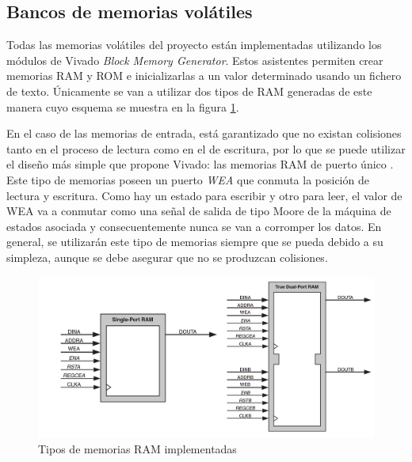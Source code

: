 \subsection{Bancos de memorias volátiles\label{memo}}
Todas las memorias volátiles del proyecto están implementadas utilizando los módulos de Vivado \emph{Block Memory Generator}. Estos asistentes permiten crear memorias RAM y ROM e inicializarlas a un valor determinado usando un fichero de texto. Únicamente se van a utilizar dos tipos de RAM generadas de este manera cuyo esquema se muestra  en la figura \ref{fig:rams}.

En el caso de las memorias de entrada, está garantizado que no existan colisiones tanto en el proceso de lectura como en el de escritura, por lo que se puede utilizar el diseño más simple que propone Vivado: las memorias RAM de puerto único \cite{ram}. Este tipo de memorias poseen un puerto \emph{WEA} que conmuta la posición de lectura y escritura. Como hay un estado para escribir y otro para leer, el valor de WEA va a conmutar como una señal de salida de tipo Moore de la máquina de estados asociada y consecuentemente nunca se van a corromper los datos. En general, se utilizarán este tipo de memorias siempre que se pueda debido a su simpleza, aunque se debe asegurar que no se produzcan colisiones.

\begin{figure}[!b]
\begin{center}
\includegraphics[width=12cm]{img/rams.png}
\caption{\label{fig:rams}Tipos de memorias RAM implementadas}
\end{center}
\end{figure}

